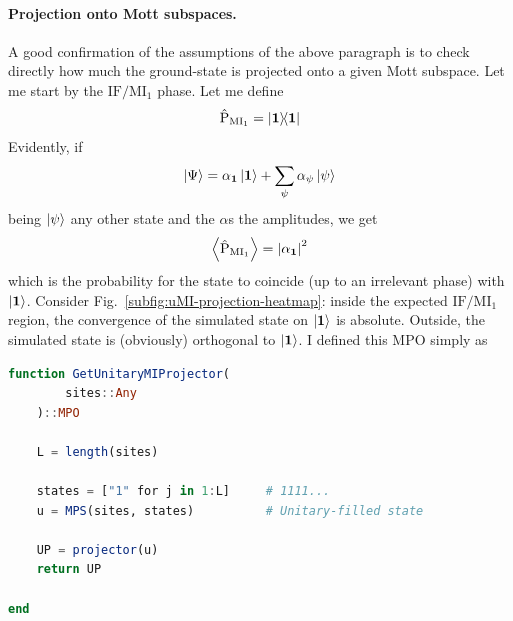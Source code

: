 \paragraph{Projection onto Mott subspaces.} A good confirmation of the assumptions of the above paragraph is to check directly how much the ground-state is projected onto a given Mott subspace. Let me start by the $\mathrm{IF}/\mathrm{MI}_1$ phase. Let me define
\[
	\hat{\mathrm{P}}_{\mathrm{MI}_1} = \op{\bm{1}}{\bm{1}}
\]
Evidently, if
\[
	\ket{\Psi} = \alpha_{\bm{1}} \ket{\bm{1}} + \sum_\psi \alpha_\psi \ket{\psi}
\]
being $\ket{\psi}$ any other state and the $\alpha$s the amplitudes, we get
\[
	\ev{\hat{\mathrm{P}}_{\mathrm{MI}_1}} = \abs{\alpha_{\bm{1}}}^2
\]
which is the probability for the state to coincide (up to an irrelevant phase) with $\ket{\bm{1}}$. Consider Fig.~\ref{subfig:uMI-projection-heatmap}: inside the expected $\mathrm{IF}/\mathrm{MI}_1$ region, the convergence of the simulated state on $\ket{\bm{1}}$ is absolute. Outside, the simulated state is (obviously) orthogonal to $\ket{\bm{1}}$. I defined this MPO simply as
\begin{lstlisting}[language=julia]
function GetUnitaryMIProjector(
		sites::Any
	)::MPO

	L = length(sites)
	
	states = ["1" for j in 1:L]		# 1111...
	u = MPS(sites, states)			# Unitary-filled state
	
	UP = projector(u)
	return UP

end
\end{lstlisting}


